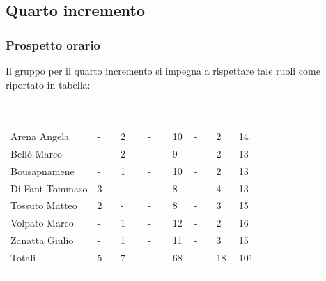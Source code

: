     \subsection{Quarto incremento} 
    {
    \subsubsection{Prospetto orario}
    {
    Il gruppo per il quarto incremento si impegna a rispettare tale ruoli come riportato in tabella:
      \setlength{\freewidth}{\dimexpr\textwidth-30\tabcolsep}
      \renewcommand{\arraystretch}{1.0}
      \setlength{\aboverulesep}{0pt}
      \setlength{\belowrulesep}{0pt}
      \begin{longtable}{C{.4\freewidth} C{.1\freewidth} C{.1\freewidth} C{.1\freewidth} C{.1\freewidth} C{.1\freewidth} C{.1\freewidth} C{.1\freewidth} C{.1\freewidth}}
      \toprule
      \textcolor{white}{\textbf{Componente}}&
      \textcolor{white}{\textbf{Re}}&
      \textcolor{white}{\textbf{Am}}&
      \textcolor{white}{\textbf{An}}&
      \textcolor{white}{\textbf{Pt}}&
      \textcolor{white}{\textbf{Pr}}&
      \textcolor{white}{\textbf{Ve}}&
      \textcolor{white}{\textbf{Ore}}\\
      \toprule
      \endhead

      Arena Angela & - & 2 & -  & 10 & - & 2 & 14 \\      
      Bellò Marco & - & 2 & - & 9 & - & 2 & 13 \\      
      Bousapnamene & - & 1 & - & 10 & - & 2 & 13 \\      
      Di Fant Tommaso & 3 & - & - & 8 & - & 4 & 13 \\      
      Tossuto Matteo & 2 & - & - & 8 & - & 3 & 15 \\      
      Volpato Marco & - & 1 & - & 12 & - & 2 & 16 \\      
      Zanatta Giulio & - & 1 & - & 11 & - & 3 & 15 \\      
      Totali & 5 & 7 & - & 68 & - & 18 & 101 \\
      \bottomrule
      \\
      \caption{}

      \end{longtable} 

}}
